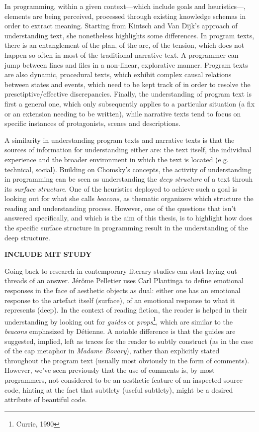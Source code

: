 \documentclass{article}
\begin{document}
In programming, within a given context—which include goals and heuristics—, elements are being perceived, processed through existing knowledge schemas in order to extract meaning. Starting from Kintsch and Van Dijk's approach of understanding text\cite{kintsch_toward_1978}, she nonetheless highlights some differences. In program texts, there is an entanglement of the plan, of the arc, of the tension, which does not happen so often in most of the traditional narrative text. A programmer can jump between lines and files in a non-linear, explorative manner. Program texts are also dynamic, procedural texts, which exhibit complex causal relations between states and events, which need to be kept track of in order to resolve the presctiptive/effective discrepancies. Finally, the understanding of program text is first a general one, which only subsequently applies to a particular situation (a fix or an extension needing to be written), while narrative texts tend to focus on specific instances of protagonists, scenes and descriptions.

A similarity in understanding program texts and narrative texts is that the sources of information for understanding either are: the text itself, the individual experience and the broader environment in which the text is located (e.g. technical, social). Building on Chomsky's concepts, the activity of understanding in programming can be seen as understanding the \emph{deep structure} of a text throuh its \emph{surface structure}\cite{chomsky_aspects_1965}. One of the heuristics deployed to achieve such a goal is looking out for what she calls \emph{beacons}, as thematic organizers which structure the reading and understanding process. However, one of the questions that isn't answered specifically, and which is the aim of this thesis, is to highlight how does the specific surface structure in programming result in the understanding of the deep structure.

\textbf{INCLUDE MIT STUDY}

Going back to research in contemporary literary studies can start laying out threads of an answer. Jérôme Pelletier uses Carl Plantinga to define emotional responses in the face of aesthetic objects as dual: either one has an emotional response to the artefact itself (surface), of an emotional response to what it represents (deep). In the context of reading fiction, the reader is helped in their understanding by looking out for \emph{guides} or \emph{props}\footnote{Currie, 1990}, which are similar to the \emph{beacons} emphasized by Détienne. A notable difference is that the guides are suggested, implied, left as traces for the reader to subtly construct (as in the case of the cap metaphor in \emph{Madame Bovary}), rather than explicitly stated throughout the program text (usually most obviously in the form of comments). However, we've seen previously that the use of comments is, by most programmers, not considered to be an aesthetic feature of an inspected source code, hinting at the fact that subtlety (useful subtlety), might be a desired attribute of beautiful code.
\end{document}

